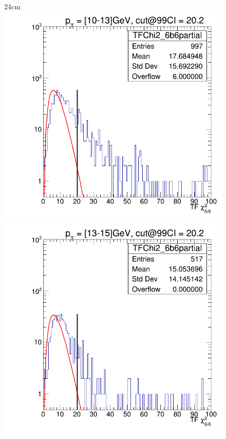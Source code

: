 \begin{landscape}
\begin{figure}[htbp]{24cm}
	\includegraphics[scale=0.25,trim={1cm 0cm 1cm 0cm},clip]{AppendixCMSL1TT/figs/chi2_6b6_10to13_99cut}		
	\includegraphics[scale=0.25,trim={1cm 0cm 1cm 0cm},clip]{AppendixCMSL1TT/figs/chi2_6b6_13to15_99cut}\\	

\end{figure}
\end{landscape}

